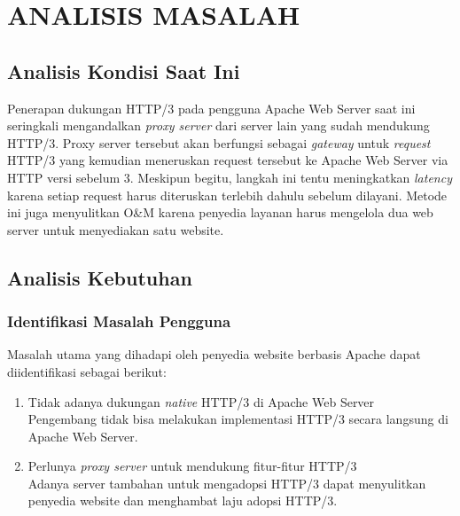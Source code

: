 \chapter{ANALISIS MASALAH}
\label{chap:analisis-masalah}
\section{Analisis Kondisi Saat Ini}
Penerapan dukungan HTTP/3 pada pengguna Apache Web Server saat ini seringkali mengandalkan \textit{proxy server} dari server lain yang sudah mendukung HTTP/3. Proxy server tersebut akan berfungsi sebagai \textit{gateway} untuk \textit{request} HTTP/3 yang kemudian meneruskan request tersebut ke Apache Web Server via HTTP versi sebelum 3. Meskipun begitu, langkah ini tentu meningkatkan \textit{latency} karena setiap request harus diteruskan terlebih dahulu sebelum dilayani. Metode ini juga menyulitkan O\&M karena penyedia layanan harus mengelola dua web server untuk menyediakan satu website.

\section{Analisis Kebutuhan}
\subsection{Identifikasi Masalah Pengguna}
Masalah utama yang dihadapi oleh penyedia website berbasis Apache dapat diidentifikasi sebagai berikut:
\begin{enumerate}
\item Tidak adanya dukungan \textit{native} HTTP/3 di Apache Web Server \\
Pengembang tidak bisa melakukan implementasi HTTP/3 secara langsung di Apache Web Server.

\item Perlunya \textit{proxy server} untuk mendukung fitur-fitur HTTP/3 \\
Adanya server tambahan untuk mengadopsi HTTP/3 dapat menyulitkan penyedia website dan menghambat laju adopsi HTTP/3.

\end{enumerate}

